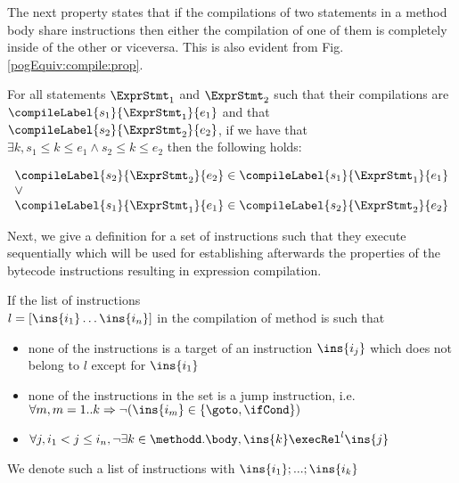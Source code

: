 The next property states that if the compilations of two
statements in a method body share instructions then 
either the compilation of one of them is completely inside of the other or viceversa.
This is also evident from Fig. \ref{pogEquiv:compile:prop}.

\begin{compProp6}\label{compile:prop:compProp6}
For all statements $\ExprStmt_1$ and $\ExprStmt_2$ such that their compilations are 
 $\compileLabel{s_1}{\ExprStmt_1}{e_1} $ and that   $\compileLabel{s_2}{\ExprStmt_2}{e_2} $, if we have that 
$ \exists k,  s_1 \le k  \le e_1 \wedge s_2 \le k  \le e_2  $ then the following holds:

$$\begin{array}{l}
         \compileLabel{s_2}{\ExprStmt_2}{e_2}  \in \compileLabel{s_1}{\ExprStmt_1}{e_1}\\   
	 \vee \\
	 \compileLabel{s_1}{\ExprStmt_1}{e_1}  \in \compileLabel{s_2}{\ExprStmt_2}{e_2} 
\end{array}$$
\end{compProp6}

Next, we give a definition for a set of instructions such that they execute sequentially which will be used for 
establishing afterwards the properties of the bytecode instructions resulting in expression compilation.
 
\begin{seqInstr} \label{seqInstr}
If the list of  instructions \\ $l  = \lbrack \ins{i_1} \ldots \ins{i_n} \rbrack$ in the compilation of method \methodd is such that 
 \begin{itemize}
      \item none of the instructions is a target of an instruction $\ins{i_j}$ which does not belong to $l$ except for $\ins{i_1}$
      \item none of the instructions in the set is a jump instruction, i.e. $\forall m, m = 1..k \Rightarrow \neg( \ins{i_m} \in  \{\goto, \ifCond\} )  $ 
      \item $  \forall j, i_1 <  j \le i_n , \neg \exists k \in \methodd.\body, \ins{k} \execRel^{l} \ins{j} $ 
 \end{itemize}

We denote such a list of instructions with $\ins{i_1};...;\ins{i_k}$

\end{seqInstr}



